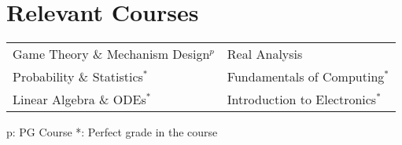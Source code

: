 \section*{\sc Relevant Courses}
\vspace{-2mm}
\hrulefill
\vspace{1mm}

\setlength{\tabcolsep}{0.20em}

\begin{tabular}{ l l }
Game Theory \& Mechanism Design$^p$ & Real Analysis \\
Probability \& Statistics$^*$ & Fundamentals of Computing$^*$ \\
Linear Algebra \& ODEs$^*$  & Introduction to Electronics$^*$ \\
\end{tabular}
\begin{small}
p: PG Course \hspace{5mm}*: Perfect grade in the course
\end{small}
